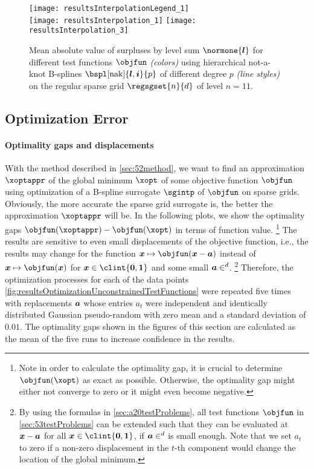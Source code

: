 \begin{figure}
  \texttt{[image: resultsInterpolationLegend\_1]}\\[2mm]%
  \texttt{[image: resultsInterpolation\_1]}%
  \hfill%
  \texttt{[image: resultsInterpolation\_3]}%
  \caption[Decay of surpluses for different test functions]{%
    Mean absolute value of surpluses by level sum $\normone{\*l}$
    for different test functions $\objfun$ \emph{(colors)}
    using hierarchical not-a-knot B-splines
    $\bspl[\nak]{\*l,\*i}{p}$ of different degree $p$ \emph{(line styles)} on
    the regular sparse grid $\regsgset{n}{d}$ of level $n = 11$.%
  }%
  \label{fig:resultsDecaySurpluses}%
\end{figure}



\subsection{Optimization Error}
\label{sec:542optimization}

\paragraph{Optimality gaps and displacements}

With the method described in \cref{sec:52method},
we want to find an approximation $\xoptappr$ of the
global minimum $\xopt$ of some objective function $\objfun$
using optimization of a B-spline surrogate $\sgintp$ of $\objfun$
on sparse grids.
Obviously, the more accurate the sparse grid surrogate is,
the better the approximation $\xoptappr$ will be.
In the following plots,
we show the optimality gaps $\objfun(\xoptappr) - \objfun(\xopt)$
in terms of function value.%
\footnote{%
  Note in order to calculate the optimality gap,
  it is crucial to determine $\objfun(\xopt)$ as exact as possible.
  Otherwise, the optimality gap might either not converge to zero
  or it might even become negative.%
}
The results are sensitive to even small displacements
of the objective function, i.e.,
the results may change for the
function $\*x \mapsto \objfun(\*x - \*a)$
instead of $\*x \mapsto \objfun(\*x)$ for $\*x \in \clint{\*0, \*1}$
and some small $\*a \in \real^d$.%
\footnote{%
  By using the formulas in \cref{sec:a20testProblems},
  all test functions $\objfun$ in \cref{sec:53testProblems}
  can be extended such that they can be evaluated at ${\boldsymbol{x}} - {\boldsymbol{a}}$
  for all $\*x \in \clint{\*0, \*1}$, if $\*a \in \real^d$ is small enough.
  Note that we set $a_t$ to zero if a non-zero displacement in
  the $t$-th component would change the location of the global minimum.%
}
Therefore, the optimization processes for each of the
data points \cref{fig:resultsOptimizationUnconstrainedTestFunctions}
were repeated five times with replacements ${\boldsymbol{a}}$
whose entries $a_t$ were independent and identically distributed Gaussian
pseudo-random with zero mean and a standard deviation of $0.01$.
The optimality gaps shown in the figures of this section are calculated
as the mean of the five runs to increase confidence in the results.


